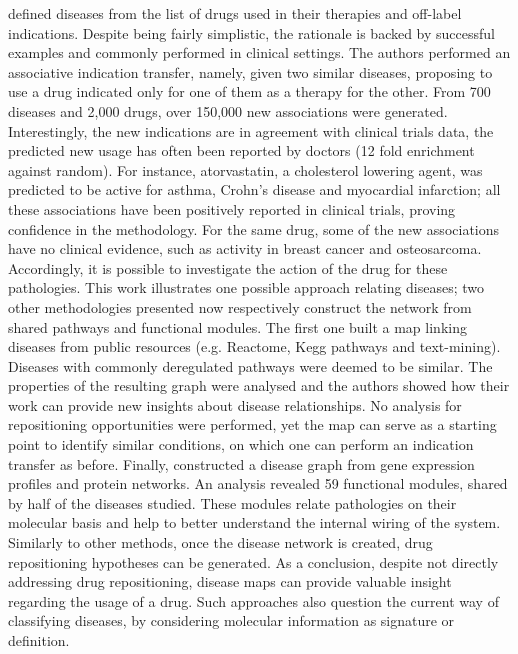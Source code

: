 \cite{chiang2009systematic} defined diseases from the list of drugs used in their therapies and off-label indications. Despite being fairly simplistic, the rationale is backed by successful examples and commonly performed in clinical settings. The authors performed an associative indication transfer, namely, given two similar diseases, proposing to use a drug indicated only for one of them as a therapy for the other. From 700 diseases and 2,000 drugs, over 150,000 new associations were generated. Interestingly, the new indications are in agreement with clinical trials data, the predicted new usage has often been reported by doctors (12 fold enrichment against random). For instance, atorvastatin, a cholesterol lowering agent, was predicted to be active for asthma, Crohn's disease and myocardial infarction; all these associations have been positively reported in clinical trials, proving confidence in the methodology. For the same drug, some of the new associations have no clinical evidence, such as activity in breast cancer and osteosarcoma. Accordingly, it is possible to investigate the action of the drug for these pathologies. This work illustrates one possible approach relating diseases; two other methodologies presented now respectively construct the network from shared pathways and functional modules.
The first one \citep{li2009pathway} built a map linking diseases from public resources (e.g. Reactome, Kegg pathways and text-mining). Diseases with commonly deregulated pathways were deemed to be similar. The properties of the resulting graph were analysed and the authors showed how their work can provide new insights about disease relationships. No analysis for repositioning opportunities were performed, yet the map can serve as a starting point to identify similar conditions, on which one can perform an indication transfer as before.
Finally, \cite{suthram2010network} constructed a disease graph from gene expression profiles and protein networks. An analysis revealed 59 functional modules, shared by half of the diseases studied. These modules relate pathologies on their molecular basis and help to better understand the internal wiring of the system. Similarly to other methods, once the disease network is created, drug repositioning hypotheses can be generated.
As a conclusion, despite not directly addressing drug repositioning, disease maps can provide valuable insight regarding the usage of a drug. Such approaches also question the current way of classifying diseases, by considering molecular information as signature or definition.

